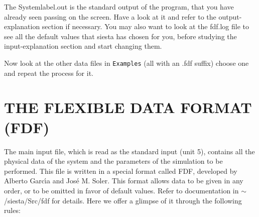 \documentclass[11pt]{article}
\begin{document}
The Systemlabel.out is the standard output of the program, that you
have already seen passing on the screen. Have a look at it
and refer to the output-explanation section if necessary.
You may also want to look at the fdf.log file to see all
the default values that siesta has chosen for you, before
studying the input-explanation section and start changing them.

Now look at the other data files in {\tt Examples}
(all with an .fdf suffix) choose one and repeat the process for it.

\section{THE FLEXIBLE DATA FORMAT (FDF)}

The main input file,
which is read as the standard input (unit 5),
contains all the physical data of the system and the parameters of 
the simulation to be performed.
This file is written in a special format called FDF, developed by 
Alberto Garc\'{\i}a and Jos\'e M. Soler. This format allows data to be 
given in any order, or to be omitted in favor of default values.
Refer to documentation in $\sim$/siesta/Src/fdf for details.
Here we offer a glimpse of it through the following rules:
\end{document}
